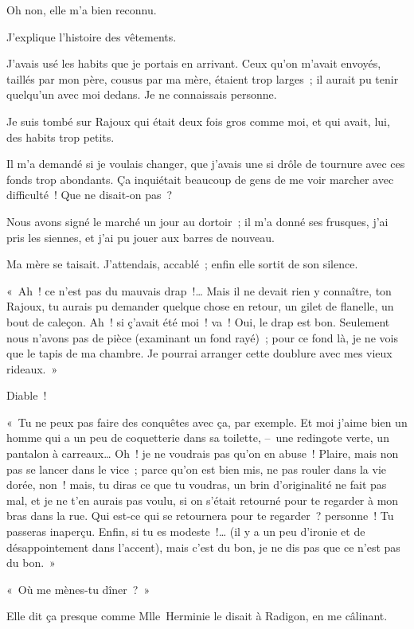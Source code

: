 \documentclass[french,twoside]{book} %
\begin{document}
Oh non, elle m’a bien reconnu.\par
J’explique l’histoire des vêtements.\par
J’avais usé les habits que je portais en arrivant. Ceux qu’on m’avait envoyés, taillés par mon père, cousus par ma mère, étaient trop larges ; il aurait pu tenir quelqu’un avec moi dedans. Je ne connaissais personne.\par
Je suis tombé sur Rajoux qui était deux fois gros comme moi, et qui avait, lui, des habits trop petits.\par
Il m’a demandé si je voulais changer, que j’avais une si drôle de tournure avec ces fonds trop abondants. Ça inquiétait beaucoup de gens de me voir marcher avec difficulté ! Que ne disait-on pas ?\par
Nous avons signé le marché un jour au dortoir ; il m’a donné ses frusques, j’ai pris les siennes, et j’ai pu jouer aux barres de nouveau.\par
\bigbreak
\noindent Ma mère se taisait. J’attendais, accablé ; enfin elle sortit de son silence.\par
« Ah ! ce n’est pas du mauvais drap !… Mais il ne devait rien y connaître, ton Rajoux, tu aurais pu demander quelque chose en retour, un gilet de flanelle, un bout de caleçon. Ah ! si ç’avait été moi ! va ! Oui, le drap est bon. Seulement nous n’avons pas de pièce (examinant un fond rayé) ; pour ce fond là, je ne vois que le tapis de ma chambre. Je pourrai arranger cette doublure avec mes vieux rideaux. »\par
Diable !\par
« Tu ne peux pas faire des conquêtes avec ça, par exemple. Et moi j’aime bien un homme qui a un peu de coquetterie dans sa toilette, – une redingote verte, un pantalon à carreaux… Oh ! je ne voudrais pas qu’on en abuse ! Plaire, mais non pas se lancer dans le vice ; parce qu’on est bien mis, ne pas rouler dans la vie dorée, non ! mais, tu diras ce que tu voudras, un brin d’originalité ne fait pas mal, et je ne t’en aurais pas voulu, si on s’était retourné pour te regarder à mon bras dans la rue. Qui est-ce qui se retournera pour te regarder ? personne ! Tu passeras inaperçu. Enfin, si tu es modeste !… (il y a un peu d’ironie et de désappointement dans l’accent), mais c’est du bon, je ne dis pas que ce n’est pas du bon. »\par
\bigbreak
\noindent « Où me mènes-tu dîner ? »\par
Elle dit ça presque comme Mlle Herminie le disait à Radigon, en me câlinant.\par
\end{document}
